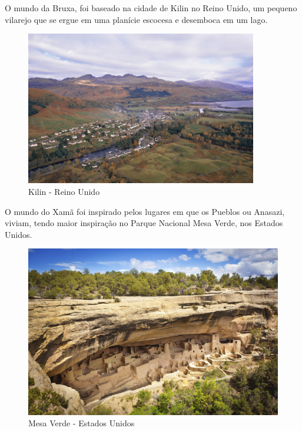 \clearpage

O mundo da Bruxa, foi baseado na cidade de Kilin no Reino Unido, um pequeno vilarejo que se ergue em uma planície escocesa e desemboca em um lago.



\begin{figure}[htb]
    \caption{\label{fig_mundoBruxa}Kilin - Reino Unido}
    \begin{center}
        \includegraphics[width=0.9\textwidth]{imagens/kilin.jpg}
    \end{center}
\end{figure}

O mundo do Xamã foi inspirado pelos lugares em que os Pueblos ou Anasazi, viviam, tendo maior inspiração no Parque Nacional Mesa Verde, nos Estados Unidos.



\begin{figure}[htb]
    \caption{\label{fig_mundoXaman}Mesa Verde - Estados Unidos}
    \begin{center}
        \includegraphics[width=\textwidth]{imagens/mesaverde.jpg}
    \end{center}
\end{figure}



